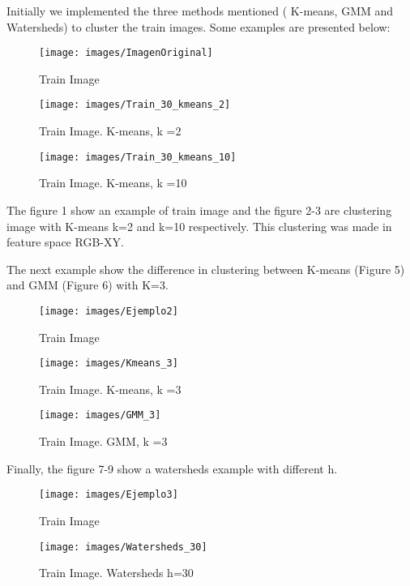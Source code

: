 \documentclass[10pt,twocolumn,letterpaper]{article}
\begin{document}
Initially we implemented the three methods mentioned ( K-means, GMM and Watersheds) to cluster the train images. Some examples are presented below:


\begin{figure}[H] \centering \texttt{[image: images/ImagenOriginal]}\caption{Train Image }\label{Comp}\end{figure}

\begin{figure}[H] \centering \texttt{[image: images/Train\_30\_kmeans\_2]}\caption{Train Image. K-means, k =2}\label{Comp}\end{figure}

\begin{figure}[H] \centering \texttt{[image: images/Train\_30\_kmeans\_10]}\caption{Train Image. K-means, k =10}\label{Comp}\end{figure}

The figure 1 show an example of train image and the figure 2-3 are clustering image with K-means k=2 and k=10 respectively. This clustering was made in feature space RGB-XY. 

The next example show the difference in clustering between K-means (Figure 5) and GMM (Figure 6) with K=3.

\begin{figure}[H] \centering \texttt{[image: images/Ejemplo2]}\caption{Train Image }\label{Comp}\end{figure}

\begin{figure}[H] \centering \texttt{[image: images/Kmeans\_3]}\caption{Train Image. K-means, k =3}\label{Comp}\end{figure}

\begin{figure}[H] \centering \texttt{[image: images/GMM\_3]}\caption{Train Image. GMM, k =3}\label{Comp}\end{figure}


Finally, the figure 7-9 show a watersheds example with different h.  

\begin{figure}[H] \centering \texttt{[image: images/Ejemplo3]}\caption{Train Image}\label{Comp}\end{figure}

\begin{figure}[H] \centering \texttt{[image: images/Watersheds\_30]}\caption{Train Image. Watersheds h=30}\label{Comp}\end{figure}
\end{document}
